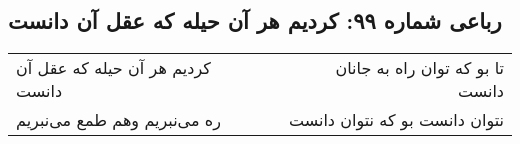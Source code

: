 \begin{center}
\section*{رباعی شماره ۹۹: کردیم هر آن حیله که عقل آن دانست}
\label{sec:sh099}
\begin{longtable}{l p{0.5cm} r}
کردیم هر آن حیله که عقل آن دانست
&&
تا بو که توان راه به جانان دانست
\\
ره می‌نبریم وهم طمع می‌نبریم
&&
نتوان دانست بو که نتوان دانست
\\
\end{longtable}
\end{center}
